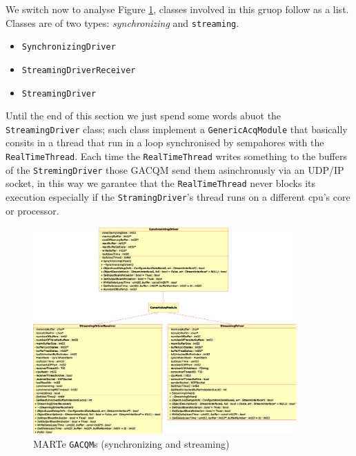 We switch now to analyse Figure \ref{f:MARTe:IOGAMs_Synch}, classes involved in this gruop follow as a list. Classes are of two types: \textit{synchronizing} and \texttt{streaming}.

\begin{itemize}
 \item \texttt{SynchronizingDriver}
 \item \texttt{StreamingDriverReceiver}
 \item \texttt{StreamingDriver}
\end{itemize}

Until the end of this section we just spend some words abuot the \texttt{StreamingDriver} class; such class implement a \texttt{GenericAcqModule} that basically consits in a thread that run in a loop synchronised by sempahores with the \texttt{RealTimeThread}. Each time the \texttt{RealTimeThread} writes something to the buffers of the \texttt{StremingDriver} those GACQM send them asinchronusly via an UDP/IP socket, in this way we garantee that the \texttt{RealTimeThread} never blocks its execution especially if the \texttt{StramingDriver}'s thread runs on a different cpu's core or processor.

\begin{figure}[h!]
 \begin{center}
  \includegraphics[width=0.9\textwidth]{MARTe/IOGAMs-Drv-Synch.eps}
  \caption{MARTe \texttt{GACQM}s (synchronizing and streaming)}
  \label{f:MARTe:IOGAMs_Synch}
 \end{center}
\end{figure}
\clearpage



